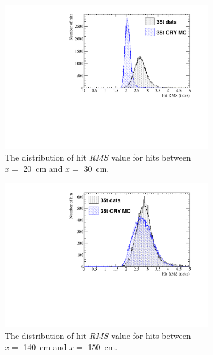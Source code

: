 \begin{figure}
  \centering
  \begin{subfigure}{0.48\textwidth}
    \centering
    \includegraphics[width=\textwidth]{CombCan_0}
    \caption{The distribution of hit $RMS$ value for hits between $x =$ 20~cm and $x =$ 30~cm.}
  \end{subfigure}%
  \hspace{0.03\textwidth}%
  \begin{subfigure}{0.48\textwidth}
    \centering
    \includegraphics[width=\textwidth]{CombCan_1}
    \caption{The distribution of hit $RMS$ value for hits between $x =$ 140~cm and $x =$ 150~cm.}
  \end{subfigure}
  \begin{subfigure}{0.48\textwidth}
    \centering

\end{subfigure}
\end{figure}
